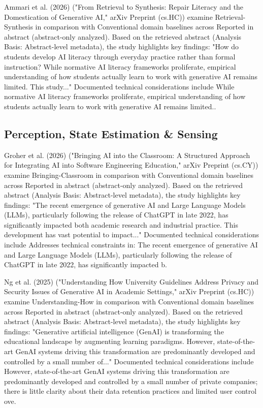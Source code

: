 \documentclass[10pt,twocolumn,letterpaper]{article}
\begin{document}
Ammari et al. (2026) \cite{ref18} ("From Retrieval to Synthesis: Repair Literacy and the Domestication of Generative AI," arXiv Preprint (cs.HC)) examine Retrieval-Synthesis in comparison with Conventional domain baselines across Reported in abstract (abstract-only analyzed). Based on the retrieved abstract (Analysis Basis: Abstract-level metadata), the study highlights key findings: "How do students develop AI literacy through everyday practice rather than formal instruction? While normative AI literacy frameworks proliferate, empirical understanding of how students actually learn to work with generative AI remains limited. This study..." Documented technical considerations include While normative AI literacy frameworks proliferate, empirical understanding of how students actually learn to work with generative AI remains limited..

\subsection{Perception, State Estimation \& Sensing}
Groher et al. (2026) \cite{ref2} ("Bringing AI into the Classroom: A Structured Approach for Integrating AI into Software Engineering Education," arXiv Preprint (cs.CY)) examine Bringing-Classroom in comparison with Conventional domain baselines across Reported in abstract (abstract-only analyzed). Based on the retrieved abstract (Analysis Basis: Abstract-level metadata), the study highlights key findings: "The recent emergence of generative AI and Large Language Models (LLMs), particularly following the release of ChatGPT in late 2022, has significantly impacted both academic research and industrial practice. This development has vast potential to impact..." Documented technical considerations include Addresses technical constraints in: The recent emergence of generative AI and Large Language Models (LLMs), particularly following the release of ChatGPT in late 2022, has significantly impacted b.

Ng et al. (2025) \cite{ref3} ("Understanding How University Guidelines Address Privacy and Security Issues of Generative AI in Academic Settings," arXiv Preprint (cs.HC)) examine Understanding-How in comparison with Conventional domain baselines across Reported in abstract (abstract-only analyzed). Based on the retrieved abstract (Analysis Basis: Abstract-level metadata), the study highlights key findings: "Generative artificial intelligence (GenAI) is transforming the educational landscape by augmenting learning paradigms. However, state-of-the-art GenAI systems driving this transformation are predominantly developed and controlled by a small number of..." Documented technical considerations include However, state-of-the-art GenAI systems driving this transformation are predominantly developed and controlled by a small number of private companies; there is little clarity about their data retention practices and limited user control ove.
\end{document}
